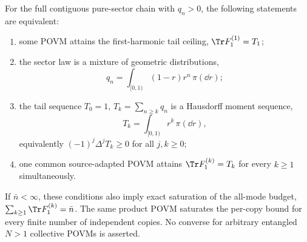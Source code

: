 \begin{theorem}
\label{thm:extremizers}
For the full contiguous pure-sector chain with $q_n>0$, the following statements are equivalent:
\begin{enumerate}
 \item some POVM attains the first-harmonic tail ceiling, $\Tr F_1^{(1)}=T_1$;
 \item the sector law is a mixture of geometric distributions,
 \begin{equation}
  q_n=\int_{[0,1)}(1-r)r^n\,\pi(\dd r);
  \label{eq:geometric-mixture}
 \end{equation}
 \item the tail sequence $T_0=1$, $T_k=\sum_{n\geq k}q_n$ is a Hausdorff moment sequence,
 \begin{equation}
  T_k=\int_{[0,1)}r^k\,\pi(\dd r),
  \label{eq:Hausdorff-tail}
 \end{equation}
 equivalently $(-1)^j\Delta^jT_k\geq0$ for all $j,k\geq0$;
 \item one common source-adapted POVM attains $\Tr F_1^{(k)}=T_k$ for every $k\geq1$ simultaneously.
\end{enumerate}
If $\bar n<\infty$, these conditions also imply exact saturation of the all-mode budget, $\sum_{k\geq1}\Tr F_1^{(k)}=\bar n$.  The same product POVM saturates the per-copy bound for every finite number of independent copies.  No converse for arbitrary entangled $N>1$ collective POVMs is asserted.
\end{theorem}

